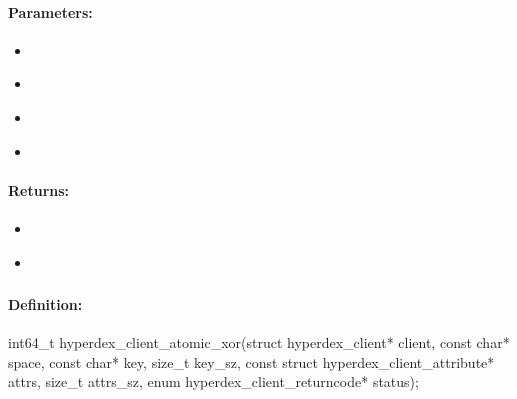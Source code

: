 \paragraph{Parameters:}
\begin{itemize}[noitemsep]
\item {}\\

\item {}\\

\item {}\\

\item {}\\

\end{itemize}

\paragraph{Returns:}
\begin{itemize}[noitemsep]
\item {}\\

\item {}\\

\end{itemize}

\pagebreak
\subsubsection{}
\label{api:c:atomic_xor}


\paragraph{Definition:}
\begin{ccode}
int64_t hyperdex_client_atomic_xor(struct hyperdex_client* client,
        const char* space,
        const char* key, size_t key_sz,
        const struct hyperdex_client_attribute* attrs, size_t attrs_sz,
        enum hyperdex_client_returncode* status);
\end{ccode}

